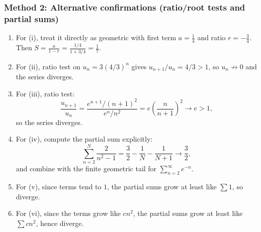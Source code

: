\documentclass[12pt]{article}
\begin{document}
\subsubsection*{Method 2: Alternative confirmations (ratio/root tests and partial sums)}

\begin{enumerate}[label=(\roman*)]
\item For (i), treat it directly as geometric with first term \(a=\frac14\) and ratio \(r=-\frac34\). Then \(S=\frac{a}{1-r}=\frac{1/4}{1+3/4}=\frac17\).

\item For (ii), ratio test on \(u_n=3(4/3)^n\) gives \(u_{n+1}/u_n=4/3>1\), so \(u_n\not\to 0\) and the series diverges.

\item For (iii), ratio test:
\[
\frac{u_{n+1}}{u_n}=\frac{e^{n+1}/(n+1)^2}{e^{n}/n^2}=e\left(\frac{n}{n+1}\right)^2\to e>1,
\]
so the series diverges.

\item For (iv), compute the partial sum explicitly:
\[
\sum_{n=2}^{N}\frac{2}{n^2-1}=\frac{3}{2}-\frac{1}{N}-\frac{1}{N+1}\to\frac{3}{2},
\]
and combine with the finite geometric tail for \(\sum_{n=2}^\infty e^{-n}\).

\item For (v), since terms tend to \(1\), the partial sums grow at least like \(\sum 1\), so diverge.

\item For (vi), since the terms grow like \(cn^2\), the partial sums grow at least like \(\sum cn^2\), hence diverge.
\end{enumerate}
\end{document}
